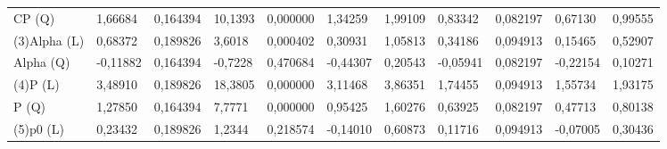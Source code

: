 \begin{table}[]
{\begin{tabular}{lllllllllll}
\rowcolor[HTML]{FFFFFF} 
{\color[HTML]{000000} CP      (Q)}    & {\color[HTML]{FF0000} 1,66684}  & {\color[HTML]{FF0000} 0,164394} & {\color[HTML]{FF0000} 10,1393}  & {\color[HTML]{FF0000} 0,000000} & {\color[HTML]{FF0000} 1,34259}        & {\color[HTML]{FF0000} 1,99109}        & {\color[HTML]{FF0000} 0,83342}  & {\color[HTML]{FF0000} 0,082197}      & {\color[HTML]{FF0000} 0,67130}        & {\color[HTML]{FF0000} 0,99555}        \\
\rowcolor[HTML]{FFFFFF} 
{\color[HTML]{000000} (3)Alpha   (L)} & {\color[HTML]{FF0000} 0,68372}  & {\color[HTML]{FF0000} 0,189826} & {\color[HTML]{FF0000} 3,6018}   & {\color[HTML]{FF0000} 0,000402} & {\color[HTML]{FF0000} 0,30931}        & {\color[HTML]{FF0000} 1,05813}        & {\color[HTML]{FF0000} 0,34186}  & {\color[HTML]{FF0000} 0,094913}      & {\color[HTML]{FF0000} 0,15465}        & {\color[HTML]{FF0000} 0,52907}        \\
\rowcolor[HTML]{FFFFFF} 
{\color[HTML]{000000} Alpha   (Q)}    & {\color[HTML]{181A1B} -0,11882} & {\color[HTML]{181A1B} 0,164394} & {\color[HTML]{181A1B} -0,7228}  & {\color[HTML]{181A1B} 0,470684} & {\color[HTML]{181A1B} -0,44307}       & {\color[HTML]{181A1B} 0,20543}        & {\color[HTML]{181A1B} -0,05941} & {\color[HTML]{181A1B} 0,082197}      & {\color[HTML]{181A1B} -0,22154}       & {\color[HTML]{181A1B} 0,10271}        \\
\rowcolor[HTML]{FFFFFF} 
{\color[HTML]{000000} (4)P       (L)} & {\color[HTML]{FF0000} 3,48910}  & {\color[HTML]{FF0000} 0,189826} & {\color[HTML]{FF0000} 18,3805}  & {\color[HTML]{FF0000} 0,000000} & {\color[HTML]{FF0000} 3,11468}        & {\color[HTML]{FF0000} 3,86351}        & {\color[HTML]{FF0000} 1,74455}  & {\color[HTML]{FF0000} 0,094913}      & {\color[HTML]{FF0000} 1,55734}        & {\color[HTML]{FF0000} 1,93175}        \\
\rowcolor[HTML]{FFFFFF} 
{\color[HTML]{000000} P       (Q)}    & {\color[HTML]{FF0000} 1,27850}  & {\color[HTML]{FF0000} 0,164394} & {\color[HTML]{FF0000} 7,7771}   & {\color[HTML]{FF0000} 0,000000} & {\color[HTML]{FF0000} 0,95425}        & {\color[HTML]{FF0000} 1,60276}        & {\color[HTML]{FF0000} 0,63925}  & {\color[HTML]{FF0000} 0,082197}      & {\color[HTML]{FF0000} 0,47713}        & {\color[HTML]{FF0000} 0,80138}        \\
\rowcolor[HTML]{FFFFFF} 
{\color[HTML]{000000} (5)p0      (L)} & {\color[HTML]{181A1B} 0,23432}  & {\color[HTML]{181A1B} 0,189826} & {\color[HTML]{181A1B} 1,2344}   & {\color[HTML]{181A1B} 0,218574} & {\color[HTML]{181A1B} -0,14010}       & {\color[HTML]{181A1B} 0,60873}        & {\color[HTML]{181A1B} 0,11716}  & {\color[HTML]{181A1B} 0,094913}      & {\color[HTML]{181A1B} -0,07005}       & {\color[HTML]{181A1B} 0,30436}        \\

\end{tabular}}
\end{table}
